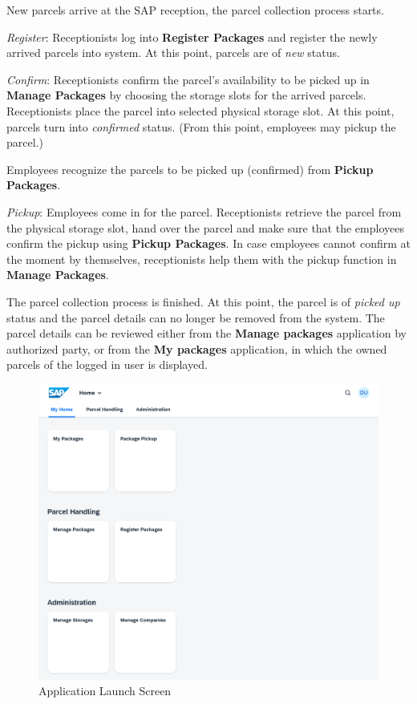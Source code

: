 \begin{compactenum}
    \item New parcels arrive at the SAP reception, the parcel collection process starts.
    \item \textit{Register}: Receptionists log into \textbf{Register Packages} and register the newly arrived parcels into system. At this point, parcels are of \textit{new} status.
    \item \textit{Confirm}: Receptionists confirm the parcel's availability to be picked up in \textbf{Manage Packages} by choosing the storage slots for the arrived parcels. Receptionists place the parcel into selected physical storage slot. At this point, parcels turn into \textit{confirmed} status. (From this point, employees may pickup the parcel.)
    \item Employees recognize the parcels to be picked up (confirmed) from \textbf{Pickup Packages}.
    \item \textit{Pickup}: Employees come in for the parcel. Receptionists retrieve the parcel from the physical storage slot, hand over the parcel and make sure that the employees confirm the pickup using \textbf{Pickup Packages}. In case employees cannot confirm at the moment by themselves, receptionists help them with the pickup function in \textbf{Manage Packages}.
    \item The parcel collection process is finished. At this point, the parcel is of \textit{picked up} status and the parcel details can no longer be removed from the system. The parcel details can be reviewed either from the \textbf{Manage packages} application by authorized party, or from the \textbf{My packages} application, in which the owned parcels of the logged in user is displayed.
\end{compactenum}

\begin{figure}[htb!]
	\centering
	\includegraphics[width=0.95\linewidth]{images/user_doc/lanchpadNewNew.png}
	\caption{Application Launch Screen}
	\label{fig:ApplicationLaunchScreen}
\end{figure}

